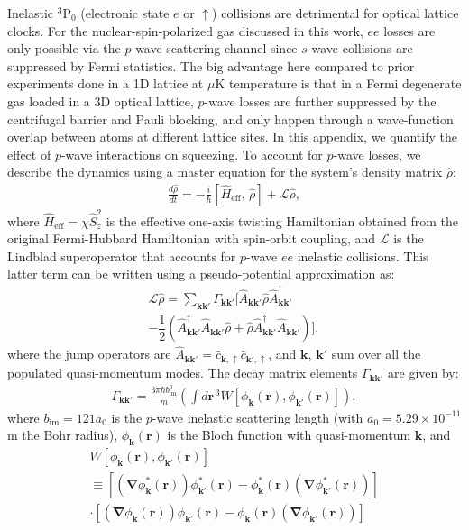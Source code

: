 \documentclass[aps,prx,superscriptaddress,notitlepage,twocolumn,longbibliography]{revtex4-2}
\newcommand{\f}[2]{\dfrac{#1}{#2}} %
\newcommand{\p}[1]{\left(#1\right)} %
\renewcommand{\sp}[1]{\left[#1\right]} %
\newcommand{\up}{\uparrow}
\begin{document}
Inelastic $^{3}\text{P}_{0}$ (electronic state $e$ or $\up$) collisions are detrimental for optical lattice clocks. For the  nuclear-spin-polarized gas discussed in this work, $ee$ losses are only possible via the $p$-wave scattering channel since $s$-wave collisions are suppressed by Fermi statistics. The big advantage here compared to  prior experiments done in a 1D lattice at $\mu$K temperature\cite{martin2013quantum} is that in a Fermi  degenerate  gas loaded in a 3D optical lattice, $p$-wave losses are further suppressed by the centrifugal barrier and Pauli blocking, and only happen through a wave-function overlap between atoms at different lattice sites.  In this appendix, we quantify the effect of $p$-wave interactions on squeezing. To account for $p$-wave losses, we describe the dynamics  using a master equation for the system's density matrix $\hat{\rho}$:
\begin{align}
  \frac{d\hat{\rho}}{dt}
  = -\frac{i}{\hbar} [\hat{H}_{\text{eff}},\,\hat{\rho}]
  + \mathcal{L}\hat{\rho},
\end{align}
where $\hat{H}_{\text{eff}}=\chi\hat{S}_z^2$ is the effective one-axis twisting Hamiltonian obtained from  the original Fermi-Hubbard Hamiltonian with spin-orbit coupling, and $\mathcal{L}$ is the Lindblad superoperator that accounts for $p$-wave $ee$ inelastic collisions. This latter term can be written using a pseudo-potential approximation as\cite{rey2014probing}:
\begin{multline}
  \mathcal{L}\hat\rho
  = \sum_{{\bm k}{\bm k'}} \Gamma_{{\bm k}{\bm k'}}
  \bigg[\hat{A}_{{\bm k}{\bm k'}}
  \hat\rho\hat{A}_{{\bm k}{\bm k'}}^\dag \\
  - \f12 \p{\hat{A}_{{\bm k}{\bm k'}}^\dag \hat{A}_{{\bm k}{\bm k'}} \hat\rho
+\hat\rho\hat{A}_{{\bm k}{\bm k'}}^\dag \hat{A}_{{\bm k}{\bm k'}}}\bigg],
\end{multline}
where the jump operators are $\hat{A}_{{\bm k}{\bm k'}}=\hat{c}_{{\bm k},\up}\hat{c}_{{\bm k'},\up}$, and
$\bm k$, $\bm k'$ sum over all the populated quasi-momentum modes. The decay matrix elements $\Gamma_{{\bm k}{\bm k'}}$ are given by:
\begin{align}
  \Gamma_{{\bm k}{\bm k'}}
  = \frac{3\pi \hbar b_{\text{im}}^3 }{m} \p{\int d{\bm r}^{\,3}
    W[\phi_{{\bm k}}({\bm r}),\phi_{{\bm k'}}({\bm r})]},
\end{align}
where $b_{\text{im}} = 121 a_0$\cite{zhang2014spectroscopic, goban2018emergence} is the $p$-wave inelastic scattering length (with $ a_0=5.29\times 10 ^{-11}$ m the Bohr radius), $\phi_{{\bm k}}({\bm r})$ is the Bloch function with quasi-momentum ${\bm k}$, and
\begin{multline}
  W\sp{\phi_{{\bm k}}({\bm r}),\phi_{{\bm k'}}({\bm r})} \\
  \equiv \sp{\p{{\bm \nabla}\phi^{*}_{{\bm k}}(\bm r)}
  \phi^{*}_{{\bm k'}}(\bm r)-\phi^{*}_{{\bm k}}(\bm r)
  \p{{\bm \nabla}\phi^{*}_{{\bm k'}}(\bm r)}} \\
  \cdot\sp{\p{{\bm \nabla}\phi_{{\bm k}}(\bm r)}
  \phi_{{\bm k'}}(\bm r)-\phi_{{\bm k}}(\bm r)
  \p{{\bm \nabla}\phi_{{\bm k'}}(\bm r)}}
\end{multline}
\end{document}
